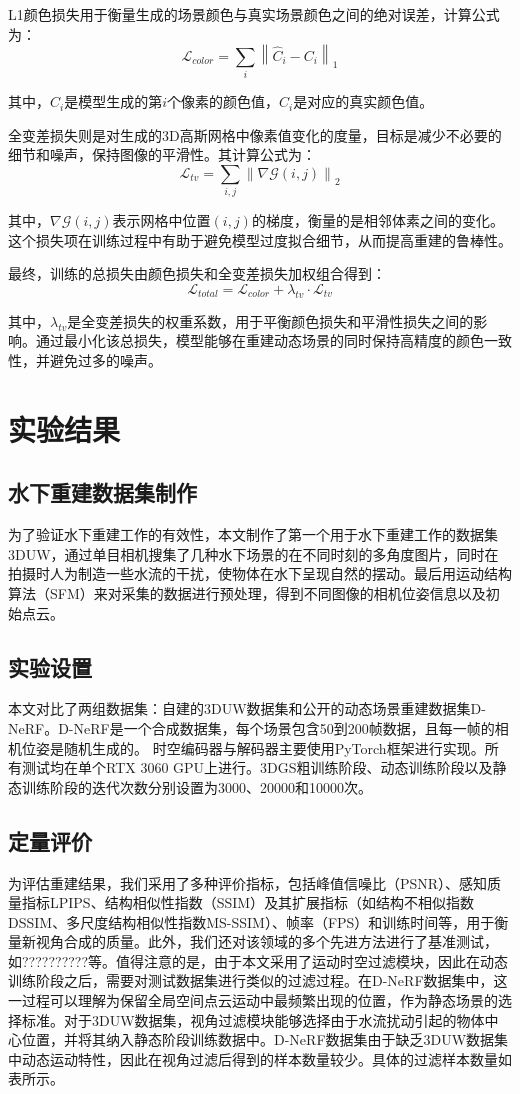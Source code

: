 L1颜色损失用于衡量生成的场景颜色与真实场景颜色之间的绝对误差，计算公式为：
$$
\mathcal{L}_{color} = \sum_{i} \left\| \hat{C}_i - C_i \right\|_1
$$

其中，$\hat{C}_i$是模型生成的第$i$个像素的颜色值，$C_i$是对应的真实颜色值。

全变差损失则是对生成的3D高斯网格中像素值变化的度量，目标是减少不必要的细节和噪声，保持图像的平滑性。其计算公式为：
$$
\mathcal{L}_{tv} = \sum_{i,j} \left\| \nabla \mathcal{G}(i,j) \right\|_2
$$

其中，$\nabla \mathcal{G}(i,j)$表示网格中位置$(i,j)$的梯度，衡量的是相邻体素之间的变化。这个损失项在训练过程中有助于避免模型过度拟合细节，从而提高重建的鲁棒性。

最终，训练的总损失由颜色损失和全变差损失加权组合得到：
$$
\mathcal{L}_{total} = \mathcal{L}_{color} + \lambda_{tv} \cdot \mathcal{L}_{tv}
$$

其中，$\lambda_{tv}$是全变差损失的权重系数，用于平衡颜色损失和平滑性损失之间的影响。通过最小化该总损失，模型能够在重建动态场景的同时保持高精度的颜色一致性，并避免过多的噪声。

\section{实验结果}
\subsection{水下重建数据集制作}
为了验证水下重建工作的有效性，本文制作了第一个用于水下重建工作的数据集 3DUW，通过单目相机搜集了几种水下场景的在不同时刻的多角度图片，同时在拍摄时人为制造一些水流的干扰，使物体在水下呈现自然的摆动。最后用运动结构算法（SFM）\cite{sfm1}\cite{sfm2}来对采集的数据进行预处理，得到不同图像的相机位姿信息以及初始点云。

\subsection{实验设置}
本文对比了两组数据集：自建的3DUW数据集和公开的动态场景重建数据集D-NeRF\cite{dnerf}。D-NeRF是一个合成数据集，每个场景包含50到200帧数据，且每一帧的相机位姿是随机生成的。
时空编码器与解码器主要使用PyTorch框架\cite{pytorch}进行实现。所有测试均在单个RTX 3060 GPU上进行。3DGS粗训练阶段、动态训练阶段以及静态训练阶段的迭代次数分别设置为3000、20000和10000次。

\subsection{定量评价}
为评估重建结果，我们采用了多种评价指标，包括峰值信噪比（PSNR）、感知质量指标LPIPS\cite{lpips}、结构相似性指数（SSIM）\cite{ssim}及其扩展指标（如结构不相似指数DSSIM、多尺度结构相似性指数MS-SSIM）、帧率（FPS）和训练时间等，用于衡量新视角合成的质量。此外，我们还对该领域的多个先进方法进行了基准测试，
如??????????等。值得注意的是，由于本文采用了运动时空过滤模块，因此在动态训练阶段之后，需要对测试数据集进行类似的过滤过程。在D-NeRF数据集中，这一过程可以理解为保留全局空间点云运动中最频繁出现的位置，作为静态场景的选择标准。对于3DUW数据集，视角过滤模块能够选择由于水流扰动引起的物体中心位置，并将其纳入静态阶段训练数据中。D-NeRF数据集由于缺乏3DUW数据集中动态运动特性，因此在视角过滤后得到的样本数量较少。具体的过滤样本数量如表所示。

